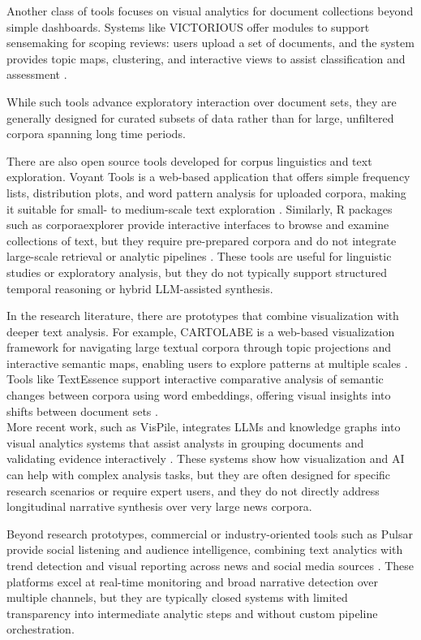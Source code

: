 Another class of tools focuses on visual analytics for document collections beyond simple dashboards. Systems like VICTORIOUS offer modules to support sensemaking for scoping reviews: users upload a set of documents, and the system provides topic maps, clustering, and interactive views to assist classification and assessment \cite{victorious2025visual}.

While such tools advance exploratory interaction over document sets, they are generally designed for curated subsets of data rather than for large, unfiltered corpora spanning long time periods.

There are also open source tools developed for corpus linguistics and text exploration. Voyant Tools is a web-based application that offers simple frequency lists, distribution plots, and word pattern analysis for uploaded corpora, making it suitable for small- to medium-scale text exploration \cite{voyant_tools_wikipedia}. Similarly, R packages such as corporaexplorer provide interactive interfaces to browse and examine collections of text, but they require pre-prepared corpora and do not integrate large-scale retrieval or analytic pipelines \cite{corporaexplorer}. These tools are useful for linguistic studies or exploratory analysis, but they do not typically support structured temporal reasoning or hybrid LLM-assisted synthesis.

In the research literature, there are prototypes that combine visualization with deeper text analysis. For example, CARTOLABE is a web-based visualization framework for navigating large textual corpora through topic projections and interactive semantic maps, enabling users to explore patterns at multiple scales \cite{cartolabe2020web}. Tools like TextEssence support interactive comparative analysis of semantic changes between corpora using word embeddings, offering visual insights into shifts between document sets \cite{textessence2021tool}. \\
More recent work, such as VisPile, integrates LLMs and knowledge graphs into visual analytics systems that assist analysts in grouping documents and validating evidence interactively \cite{vispile2025visual}. These systems show how visualization and AI can help with complex analysis tasks, but they are often designed for specific research scenarios or require expert users, and they do not directly address longitudinal narrative synthesis over very large news corpora.

Beyond research prototypes, commercial or industry-oriented tools such as Pulsar provide social listening and audience intelligence, combining text analytics with trend detection and visual reporting across news and social media sources \cite{pulsar_wikipedia}. These platforms excel at real-time monitoring and broad narrative detection over multiple channels, but they are typically closed systems with limited transparency into intermediate analytic steps and without custom pipeline orchestration.

